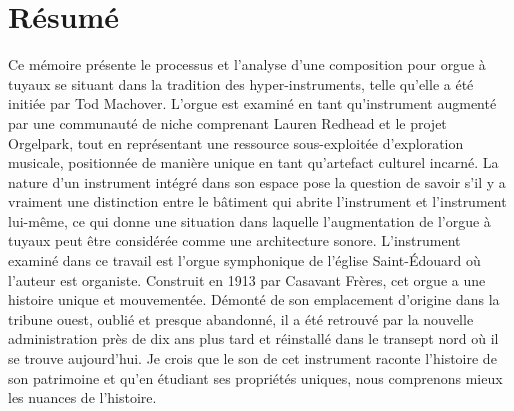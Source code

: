 \documentclass[12pt,twoside,maitrise]{dms_ks}
\theoremstyle{definition}
\begin{document}

\maketitle

\maketitle


\francais

\chapter*{Résumé}

Ce mémoire présente le processus et l'analyse d'une composition pour orgue à tuyaux se situant dans la tradition des hyper-instruments, telle qu'elle a été initiée par Tod Machover. 
L'orgue est examiné en tant qu'instrument augmenté par une communauté de niche comprenant Lauren Redhead et le projet Orgelpark, tout en représentant une ressource sous-exploitée d'exploration musicale, positionnée de manière unique en tant qu'artefact culturel incarné. 
La nature d'un instrument intégré dans son espace pose la question de savoir s'il y a vraiment une distinction entre le bâtiment qui abrite l'instrument et l'instrument lui-même, ce qui donne une situation dans laquelle l'augmentation de l'orgue à tuyaux peut être considérée comme une architecture sonore. 
L'instrument examiné dans ce travail est l'orgue symphonique de l’église Saint-Édouard où l'auteur est organiste. 
Construit en 1913 par Casavant Frères, cet orgue a une histoire unique et mouvementée. 
Démonté de son emplacement d'origine dans la tribune ouest, oublié et presque abandonné, il a été retrouvé par la nouvelle administration près de dix ans plus tard et réinstallé dans le transept nord où il se trouve aujourd'hui. 
Je crois que le son de cet instrument raconte l'histoire de son patrimoine et qu'en étudiant ses propriétés uniques, nous comprenons mieux les nuances de l'histoire. 
\end{document}
